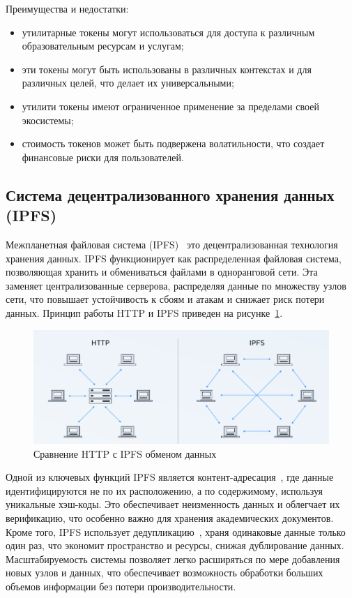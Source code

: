 Преимущества и недостатки:
\begin{itemize}
    \item утилитарные токены могут использоваться для доступа к различным образовательным ресурсам и услугам;
    \item эти токены могут быть использованы в различных контекстах и для различных целей, что делает их универсальными;
    \item утилити токены имеют ограниченное применение за пределами своей экосистемы;
    \item стоимость токенов может быть подвержена волатильности, что создает финансовые риски для пользователей.
\end{itemize}

\subsection{Система децентрализованного хранения данных (IPFS)}

Межпланетная файловая система (IPFS)~\cite{bib:ipfs, bib:ipfs_is} это децентрализованная технология хранения данных. IPFS функционирует как распределенная файловая система, позволяющая хранить и обмениваться файлами в одноранговой сети. Эта заменяет централизованные серверова, распределяя данные по множеству узлов сети, что повышает устойчивость к сбоям и атакам и снижает риск потери данных. Принцип работы HTTP и IPFS приведен на рисунке~\ref{fig:http_vs_ipfs}.

\begin{figure}[H]   
	\centering
	\includegraphics[width=\textwidth]{images/1.http_vs_ipfs.png}
	\parskip=6pt
	\caption{Сравнение HTTP с IPFS обменом данных}
	\label{fig:http_vs_ipfs}
\end{figure}

Одной из ключевых функций IPFS является контент-адресация~\cite{bib:ipfs_2}, где данные идентифицируются не по их расположению, а по содержимому, используя уникальные хэш-коды. Это обеспечивает неизменность данных и облегчает их верификацию, что особенно важно для хранения академических документов. Кроме того, IPFS использует дедупликацию~\cite{bib:dedup}, храня одинаковые данные только один раз, что экономит пространство и ресурсы, снижая дублирование данных. Масштабируемость системы позволяет легко расширяться по мере добавления новых узлов и данных, что обеспечивает возможность обработки больших объемов информации без потери производительности.

